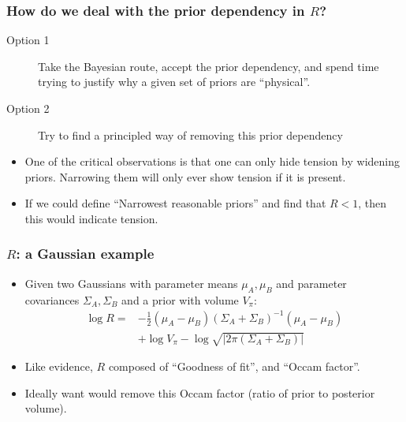 \documentclass[%
]{beamer}
\begin{document}
\begin{frame}
    \frametitle{How do we deal with the prior dependency in $R$?}
    \begin{description}
        \item[Option 1] Take the Bayesian route, accept the prior dependency, and spend time trying to justify why a given set of priors are ``physical''.
        \item[Option 2] Try to find a principled way of removing this prior dependency
    \end{description}
    \begin{itemize}
        \item One of the critical observations is that one can only hide tension by widening priors. Narrowing them will only ever show tension if it is present.
        \item If we could define ``Narrowest reasonable priors'' and find that $R<1$, then this would indicate tension.
    \end{itemize}
\end{frame}

\begin{frame}
    \frametitle{$R$: a Gaussian example}
    \begin{itemize}
        \item Given two Gaussians with parameter means $\mu_A,\mu_B$ and parameter covariances $\Sigma_A,\Sigma_B$ and a prior with volume $V_\pi$:
            \begin{align}
                \log R =& -\frac{1}{2} (\mu_A-\mu_B){(\Sigma_{A}+\Sigma_{B})}^{-1}(\mu_A-\mu_B)\nonumber\\
                & + \log V_\pi\nonumber -\log\sqrt{|2\pi(\Sigma_{A}+\Sigma_{B})|} 
            \end{align}
        \item Like evidence, $R$ composed of ``Goodness of fit'', and ``Occam factor''.
        \item Ideally want would remove this Occam factor (ratio of prior to posterior volume).
    \end{itemize}
\end{frame}
\end{document}
